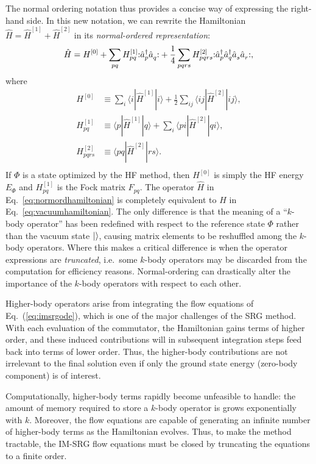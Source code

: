 The normal ordering notation thus provides a concise way of expressing the right-hand side.  In this new notation, we can rewrite the Hamiltonian $\hat H = \hat{H}^{[1]} + \hat{H}^{[2]}$ in its \emph{normal-ordered representation}:
\begin{align}
  \hat{H} = H^{[0]} + \sum_{p q} H^{[1]}_{p q} \mathopen: \hat{a}_p^\dagger \hat{a}_q^{} \mathclose: + \frac{1}{4} \sum_{p q r s} H^{[2]}_{p q r s} \mathopen: \hat{a}_p^\dagger \hat{a}_q^\dagger \hat{a}_s^{} \hat{a}_r^{} \mathclose:,
  \label{eq:normordhamiltonian}
\end{align}
where
\begin{align*}
  H^{[0]} &\equiv \sum_i \langle i | \hat{H}^{[1]} | i \rangle + \frac{1}{2} \sum_{i j} \langle i j | \hat{H}^{[2]} | i j \rangle, \\
  H^{[1]}_{p q} &\equiv \langle p | \hat{H}^{[1]} | q \rangle + \sum_i \langle p i | \hat{H}^{[2]} | q i \rangle, \\
  H^{[2]}_{p q r s} &\equiv \langle p q | \hat{H}^{[2]} | r s \rangle. \\
\end{align*}
If $\Phi$ is a state optimized by the HF method, then $H^{[0]}$ is
simply the HF energy $E_\Phi$ and $H^{[1]}_{p q}$ is the Fock matrix
$F_{p q}$.  The operator $\hat H$ in
Eq.\ \eqref{eq:normordhamiltonian} is completely equivalent to $\hat
H$ in Eq.\ \eqref{eq:vacuumhamiltonian}.  The only difference is that
the meaning of a ``$k$-body operator'' has been redefined with respect
to the reference state $\Phi$ rather than the vacuum state $|  \rangle$,
causing matrix elements to be reshuffled among the $k$-body operators.
Where this makes a critical difference is when the operator
expressions are \emph{truncated}, i.e.\ some $k$-body operators may be
discarded from the computation for efficiency reasons.
Normal-ordering can drastically alter the importance of the $k$-body
operators with respect to each other.

Higher-body operators arise from integrating the flow equations of Eq.~(\ref{eq:imsrgode}), 
which is one of the major challenges of the SRG
method.  With each evaluation of the commutator, the Hamiltonian gains
terms of higher order, and these induced contributions will in
subsequent integration steps feed back into terms of lower order.
Thus, the higher-body contributions are not irrelevant to the final
solution even if only the ground state energy (zero-body component) is
of interest.

Computationally, higher-body terms rapidly become unfeasible to
handle: the amount of memory required to store a $k$-body operator is
grows exponentially with $k$.  Moreover, the flow equations are
capable of generating an infinite number of higher-body terms as the
Hamiltonian evolves.  Thus, to make the method tractable, the IM-SRG
flow equations must be closed by truncating the equations to a finite
order.

